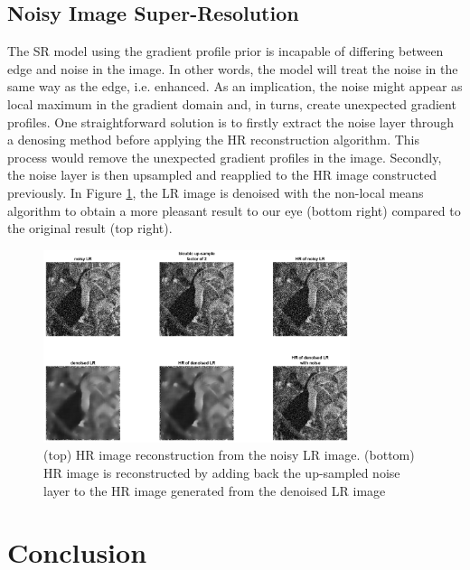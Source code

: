 \documentclass[a4paper,11pt]{article}
\begin{document}
\subsection{Noisy Image Super-Resolution}

The SR model using the gradient profile prior is incapable of differing between edge and noise in the image. In other words, the model will treat the noise in the same way as the edge, i.e. enhanced. As an implication, the noise might appear as local maximum in the gradient domain and, in turns, create unexpected gradient profiles. One straightforward solution is to firstly extract the noise layer through a denosing method before applying the HR reconstruction algorithm. This process would remove the unexpected gradient profiles in the image. Secondly, the noise layer is then upsampled and reapplied to the HR image constructed previously. In Figure \ref{fig:sden}, the LR image is denoised with the non-local means algorithm \cite{nlm05} to obtain a more pleasant result to our eye (bottom right) compared to the original result (top right).

\begin{figure}[H]
	\centering
	\includegraphics[width=0.8\textwidth]{simple denoise.png}
	\caption{(top) HR image reconstruction from the noisy LR image. (bottom) HR image is reconstructed by adding back the up-sampled noise layer to the HR image generated from the denoised LR image}
	\label{fig:sden}
\end{figure}

\section{Conclusion}
\end{document}
